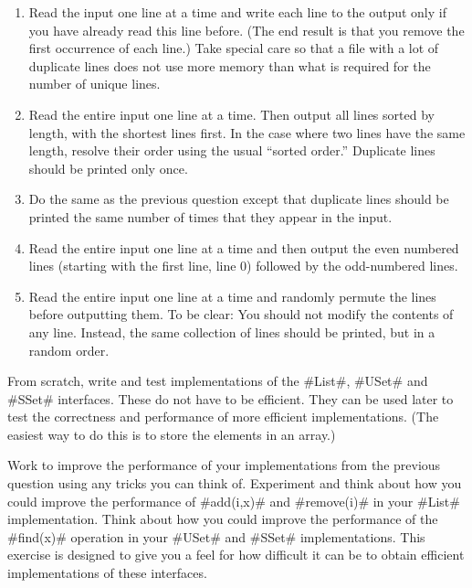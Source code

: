 \begin{exc}
\begin{enumerate}
    \item Read the input one line at a time and write each line to the
      output only if you have already read this line before. (The end
      result is that you remove the first occurrence of each line.)
      Take special care so that a file with a lot of duplicate lines
      does not use more memory than what is required for the number of
      unique lines.

    \item Read the entire input one line at a time. Then output all lines
      sorted by length, with the shortest lines first. In the case where
      two lines have the same length, resolve their order using the usual
      ``sorted order.''  Duplicate lines should be printed only once.

    \item Do the same as the previous question except that duplicate lines
      should be printed the same number of times that they appear in the input.

    \item Read the entire input one line at a time and then output the
      even numbered lines (starting with the first line, line 0) followed
      by the odd-numbered lines.

    \item Read the entire input one line at a time and randomly permute
      the lines before outputting them.  To be clear: You should not
      modify the contents of any line. Instead, the same collection of
      lines should be printed, but in a random order.
  \end{enumerate}
\end{exc}

\begin{exc}
  From scratch, write and test implementations of the #List#, #USet#
  and #SSet# interfaces.  These do not have to be efficient.  They can
  be used later to test the correctness and performance of more efficient
  implementations.  (The easiest way to do this is to store the elements
  in an array.)
\end{exc}


\begin{exc}
  Work to improve the performance of your implementations from the
  previous question using any tricks you can think of.  Experiment and
  think about how you could improve the performance of #add(i,x)# and
  #remove(i)# in your #List# implementation.  Think about how you could
  improve the performance of the #find(x)# operation in your #USet#
  and #SSet# implementations.  This exercise is designed to give you a
  feel for  how difficult it can be to obtain efficient implementations
  of these interfaces.
\end{exc}




